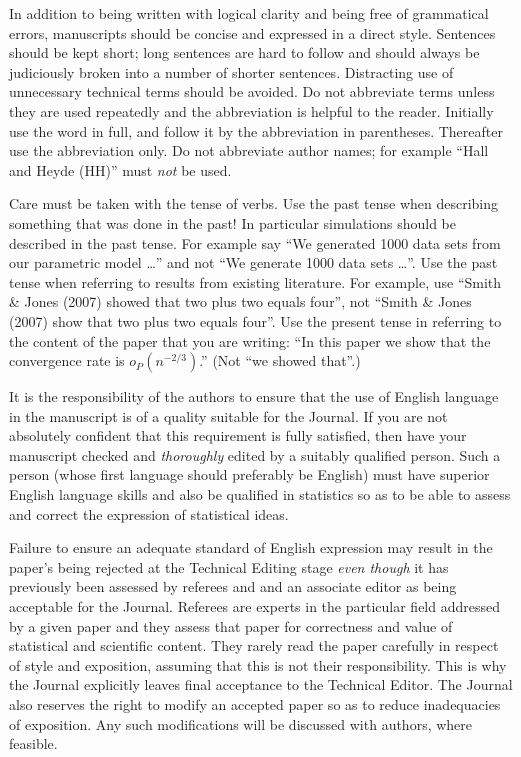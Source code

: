 \documentclass[
  times,
  doublespace]{anzsauth}
\begin{document}
In addition to being written with logical clarity and being free of
grammatical errors, manuscripts should be concise and expressed in a
direct style. Sentences should be kept short; long sentences are hard to
follow and should always be judiciously broken into a number of shorter
sentences. Distracting use of unnecessary technical terms should be
avoided. Do not abbreviate terms unless they are used repeatedly and the
abbreviation is helpful to the reader. Initially use the word in full,
and follow it by the abbreviation in parentheses. Thereafter use the
abbreviation only. Do not abbreviate author names; for example ``Hall
and Heyde (HH)'' must \emph{not} be used.

Care must be taken with the tense of verbs. Use the past tense when
describing something that was done in the past! In particular
simulations should be described in the past tense. For example say ``We
generated 1000 data sets from our parametric model \ldots'' and not ``We
generate 1000 data sets \ldots''. Use the past tense when referring to
results from existing literature. For example, use ``Smith \& Jones
(2007) showed that two plus two equals four'', not ``Smith \& Jones
(2007) show that two plus two equals four''. Use the present tense in
referring to the content of the paper that you are writing: ``In this
paper we show that the convergence rate is \(o_P(n^{-2/3})\).'' (Not
``we showed that''.)

It is the responsibility of the authors to ensure that the use of
English language in the manuscript is of a quality suitable for the
Journal. If you are not absolutely confident that this requirement is
fully satisfied, then have your manuscript checked and \emph{thoroughly}
edited by a suitably qualified person. Such a person (whose first
language should preferably be English) must have superior English
language skills and also be qualified in statistics so as to be able to
assess and correct the expression of statistical ideas.

Failure to ensure an adequate standard of English expression may result
in the paper's being rejected at the Technical Editing stage \emph{even
though} it has previously been assessed by referees and and an associate
editor as being acceptable for the Journal. Referees are experts in the
particular field addressed by a given paper and they assess that paper
for correctness and value of statistical and scientific content. They
rarely read the paper carefully in respect of style and exposition,
assuming that this is not their responsibility. This is why the Journal
explicitly leaves final acceptance to the Technical Editor. The Journal
also reserves the right to modify an accepted paper so as to reduce
inadequacies of exposition. Any such modifications will be discussed
with authors, where feasible.
\end{document}
